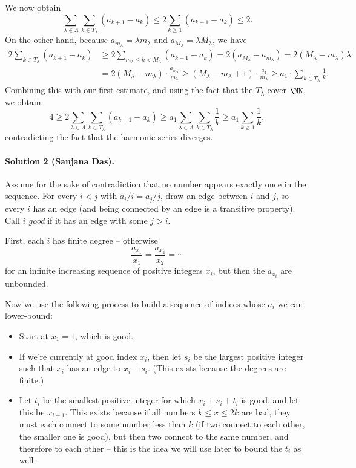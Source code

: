 We now obtain
\[
\sum_{\lambda \in \Lambda} \sum_{k \in T_\lambda} (a_{k+1}-a_k) \le 2 \sum_{k \ge 1} (a_{k+1} - a_k) \le 2.
\]
On the other hand,  because $a_{m_\lambda} = \lambda m_\lambda$ and $a_{M_\lambda} = \lambda M_\lambda$, we have
\begin{align*}
  2\sum_{k \in T_\lambda} (a_{k+1} - a_k) &\ge2 \sum_{m_\lambda \le k < M_\lambda}
  (a_{k+1} - a_k) = 2(a_{M_\lambda}-a_{m_\lambda}) = 2(M_\lambda-m_\lambda)\lambda
                                        \\
                                          & = 2(M_\lambda - m_\lambda) \cdot
                                        \frac{a_{m_\lambda}}{m_\lambda} \ge
                                        (M_\lambda - m_\lambda + 1) \cdot
                                        \frac{a_1}{m_\lambda} \ge a_1 \cdot
                                        \sum_{k \in T_\lambda} \frac1k.
\end{align*}
Combining this with our first estimate, and using the fact that the $T_\lambda$ cover $\NN$,  we obtain
\[
4 \ge 2 \sum_{\lambda \in \Lambda} \sum_{k \in T_\lambda} (a_{k+1}-a_k) \ge a_1 \sum_{\lambda \in \Lambda} \sum_{k \in T_\lambda} \frac1k \ge a_1 \sum_{k \ge 1} \frac1k,
\]
contradicting the fact that the harmonic series diverges.

\paragraph{Solution 2 (Sanjana Das).}

Assume for the sake of contradiction that no number appears exactly once in the
sequence. For every $i < j$ with $a_i/i = a_j/j$, draw an edge
between $i$ and $j$, so every $i$ has an edge (and being connected by an edge is
a transitive property). Call $i$ \emph{good} if it has an edge with some $j > i$.

First, each $i$ has finite degree -- otherwise \[\frac{a_{x_1}}{x_1} = \frac{a_{x_2}}{x_2} = \dotsb\] for an infinite increasing sequence of positive integers $x_i$, but then the $a_{x_i}$ are unbounded.

Now we use the following process to build a sequence of indices whose $a_i$ we can lower-bound:
\begin{itemize}
    \item Start at $x_1 = 1$, which is good.
    \item If we're currently at good index $x_i$, then let $s_i$ be the largest positive integer such that $x_i$ has an edge to $x_i + s_i$. (This exists because the degrees are finite.)
    \item Let $t_i$ be the smallest positive integer for which $x_i + s_i + t_i$ is good, and let this be $x_{i + 1}$. This exists because if all numbers $k \leq x \leq 2k$ are bad, they must each connect to some number less than $k$ (if two connect to each other, the smaller one is good), but then two connect to the same number, and therefore to each other -- this is the idea we will use later to bound the $t_i$ as well.
\end{itemize}

